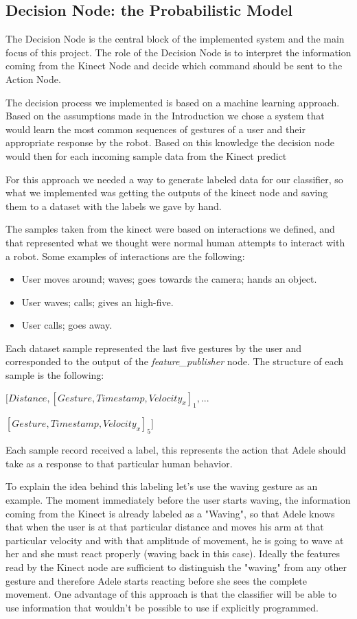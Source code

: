 \subsection{Decision Node: the Probabilistic Model}
The Decision Node is the central block of the implemented system and the main focus of this project. The role of the Decision Node is to interpret the information coming from the Kinect Node and decide which command should be sent to the Action Node.

The decision process we implemented is based on a machine learning approach. Based on the assumptions made in the Introduction we chose a system that would learn the most common sequences of gestures of a user and their appropriate response by the robot. Based on this knowledge the decision node would then for each incoming sample data from the Kinect predict



For this approach we needed a way to generate labeled data for our classifier, so what we implemented was getting the outputs of the kinect node and saving them to a dataset with the labels we gave by hand.

The samples taken from the kinect were based on interactions we defined, and that represented what we thought were normal human attempts to interact with a robot. Some examples of interactions are the following:

\begin{itemize}
\item User moves around; waves; goes towards the camera; hands an object.
\item User waves; calls; gives an high-five.
\item User calls; goes away.
\end{itemize}

Each dataset sample represented the last five gestures by the user and corresponded to the output of the \textit{feature\_publisher} node. The structure of each sample is the following:

\vspace*{4pt}
$\Big[Distance, [Gesture, Timestamp, Velocity_x]_1,...$

$[Gesture, Timestamp, Velocity_x]_5\Big]$
\vspace*{4pt}

Each sample record received a label, this represents the action that Adele should take as a response to that particular human behavior.

To explain the idea behind this labeling let's use the waving gesture as an example. The moment immediately before the user starts waving, the information coming from the Kinect is already labeled as a "Waving", so that Adele knows that when the user is at that particular distance and moves his arm at that particular velocity and with that amplitude of movement, he is going to wave at her and she must react properly (waving back in this case). Ideally the features read by the Kinect node are sufficient to distinguish the "waving" from any other gesture and therefore Adele starts reacting before she sees the complete movement. One advantage of this approach is that the classifier will be able to use information that wouldn't be possible to use if explicitly programmed.

